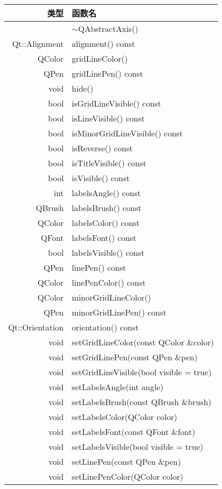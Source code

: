 \begin{longtable}{|r|l|}
\hline
类型  & 函数名\\
\hline
& $\sim$QAbstractAxis() \\
\hline
Qt::Alignment&	alignment() const \\
\hline
QColor&	gridLineColor()\\
\hline
QPen&	gridLinePen() const\\
\hline
void&	hide()\\
\hline
bool&	isGridLineVisible() const\\
\hline
bool&	isLineVisible() const\\
\hline
bool&	isMinorGridLineVisible() const\\
\hline
bool&	isReverse() const\\
\hline
bool&	isTitleVisible() const\\
\hline
bool&	isVisible() const\\
\hline
int&	labelsAngle() const\\
\hline
QBrush&	labelsBrush() const\\
\hline
QColor&	labelsColor() const\\
\hline
QFont&	labelsFont() const\\
\hline
bool&	labelsVisible() const\\
\hline
QPen&	linePen() const\\
\hline
QColor&	linePenColor() const\\
\hline
QColor&	minorGridLineColor()\\
\hline
QPen&	minorGridLinePen() const\\
\hline
Qt::Orientation &orientation() const\\
\hline
void&	setGridLineColor(const QColor \&color)\\
\hline
void&	setGridLinePen(const QPen \&pen)\\
\hline
void&	setGridLineVisible(bool visible = true)\\
\hline
void&	setLabelsAngle(int angle)\\
\hline
void&	setLabelsBrush(const QBrush \&brush)\\
\hline
void&	setLabelsColor(QColor color)\\
\hline
void&	setLabelsFont(const QFont \&font)\\
\hline
void	&setLabelsVisible(bool visible = true)\\
\hline
void	&setLinePen(const QPen \&pen)\\
\hline
void	&setLinePenColor(QColor color)\\

\end{longtable}
